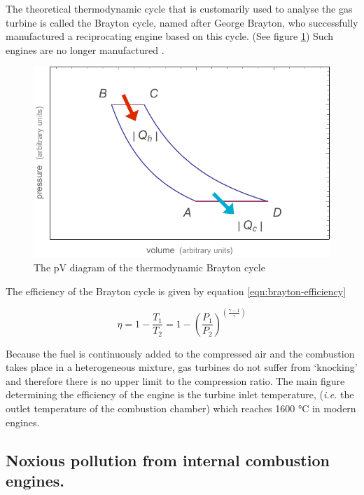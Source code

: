 The theoretical thermodynamic cycle that is customarily used to analyse the gas
turbine is called the Brayton cycle, named after George Brayton, who
successfully manufactured a reciprocating engine based on this cycle. (See
figure \ref{fig:brayton-cycle}) Such engines are no longer
manufactured \autocite[Chapter 10]{Cummins1989}.

\begin{figure}
	\centering
	\includegraphics[width=\textwidth]{Figures/brayton-cycle}
	\decoRule
	\caption[The Brayton cycle]{The pV diagram of the thermodynamic Brayton cycle}
\label{fig:brayton-cycle}
\end{figure}

The efficiency of the Brayton cycle is given by equation \ref{eqn:brayton-efficiency}

\begin{equation}
	\eta = 1 - \frac{T_{1}}{T_{2}} = 1 - (\frac{ P_{1} }{ P_{2} })^{(\frac{\gamma-1}{\gamma})}
\label{eqn:brayton-efficiency}
\end{equation}

Because the fuel is continuously added to the compressed air and the combustion
takes place in a heterogeneous mixture, gas turbines do not suffer from
`knocking' and therefore there is no upper limit to the compression ratio. The
main figure determining the efficiency of the engine is the turbine inlet
temperature, (\textit{i.e.} the outlet temperature of the combustion chamber)
which reaches 1600 °C in modern engines.

\subsection{Noxious pollution from internal combustion engines. }

